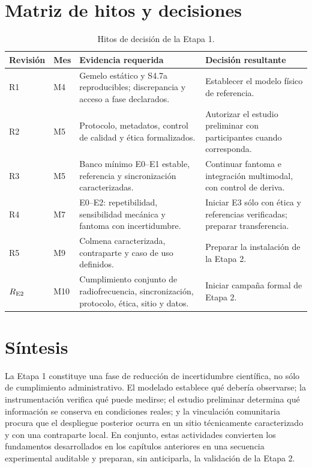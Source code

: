 \section{Matriz de hitos y decisiones}

\begin{table}[H]
\centering
\caption{Hitos de decisión de la Etapa 1.}
\label{tab:stage1_milestones}
\small
\begin{tabularx}{\textwidth}{P{1.7cm}P{1.4cm}L L}
\toprule
\textbf{Revisión} & \textbf{Mes} & \textbf{Evidencia requerida} & \textbf{Decisión resultante}\\
\midrule
R1 & M4
& Gemelo estático y S4.7a reproducibles; discrepancia y acceso a fase declarados.
& Establecer el modelo físico de referencia.\\
R2 & M5
& Protocolo, metadatos, control de calidad y ética formalizados.
& Autorizar el estudio preliminar con participantes cuando corresponda.\\
R3 & M5
& Banco mínimo E0--E1 estable, referencia y sincronización caracterizadas.
& Continuar fantoma e integración multimodal, con control de deriva.\\
R4 & M7
& E0--E2: repetibilidad, sensibilidad mecánica y fantoma con incertidumbre.
& Iniciar E3 sólo con ética y referencias verificadas; preparar transferencia.\\
R5 & M9
& Colmena caracterizada, contraparte y caso de uso definidos.
& Preparar la instalación de la Etapa 2.\\
$R_{\rm E2}$ & M10
& Cumplimiento conjunto de radiofrecuencia, sincronización, protocolo, ética, sitio y datos.
& Iniciar campaña formal de Etapa 2.\\
\bottomrule
\end{tabularx}
\end{table}

\section{Síntesis}

La Etapa 1 constituye una fase de reducción de incertidumbre científica, no sólo de
cumplimiento administrativo. El modelado establece qué debería observarse; la
instrumentación verifica qué puede medirse; el estudio preliminar determina qué
información se conserva en condiciones reales; y la vinculación comunitaria procura que
el despliegue posterior ocurra en un sitio técnicamente caracterizado y con una contraparte
local. En conjunto, estas actividades convierten los fundamentos desarrollados en los
capítulos anteriores en una secuencia experimental auditable y preparan, sin anticiparla,
la validación de la Etapa 2.
